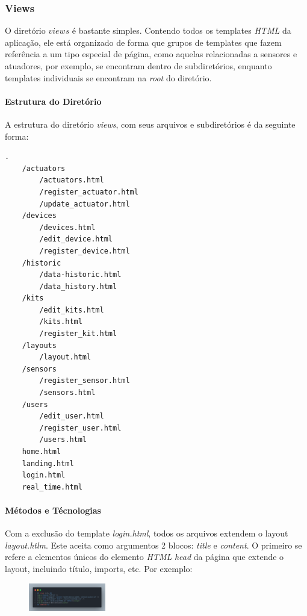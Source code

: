 \documentclass[conference, a4paper, 12pt]{IEEEtran}
\begin{document}
\subsubsection{Views}
O diretório $views$ é bastante simples. Contendo todos os templates \emph{HTML} da aplicação, ele está organizado de forma que grupos de templates que fazem referência a um tipo especial de página, como aquelas relacionadas a sensores e atuadores, por exemplo, se encontram dentro de subdiretórios, enquanto templates individuais se encontram na \emph{root} do diretório.

\paragraph{Estrutura do Diretório}
A estrutura do diretório \emph{views}, com seus arquivos e subdiretórios é da seguinte forma:

\begin{lstlisting}[caption=Estrutura do Diretório]
  .
    /actuators
        /actuators.html
        /register_actuator.html
        /update_actuator.html
    /devices
        /devices.html
        /edit_device.html
        /register_device.html
    /historic
        /data-historic.html
        /data_history.html
    /kits
        /edit_kits.html
        /kits.html
        /register_kit.html
    /layouts
        /layout.html
    /sensors
        /register_sensor.html
        /sensors.html
    /users
        /edit_user.html
        /register_user.html
        /users.html
    home.html
    landing.html
    login.html
    real_time.html
\end{lstlisting}

      \paragraph{Métodos e Técnologias}
      Com a exclusão do template \emph{login.html}, todos os arquivos extendem o layout \emph{layout.htlm}. Este aceita como argumentos 2 blocos: \emph{title} e \emph{content}. O primeiro se refere a elementos únicos do elemento \emph{HTML} \emph{head} da página que extende o layout, incluindo título, imports, etc. Por exemplo:

      \begin{figure}[h]
        \begin{center}
          \includegraphics[width=0.30\textwidth]{title-block.png}
        \end{center}
      \end{figure}
\end{document}
